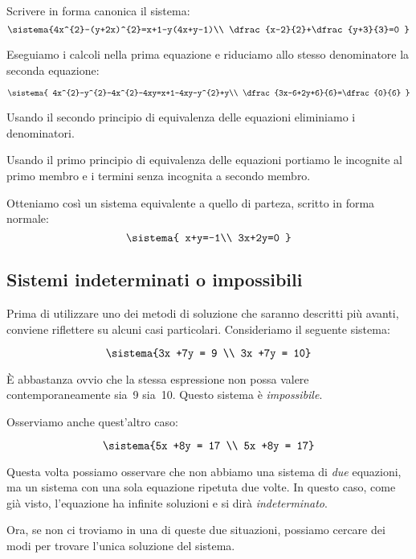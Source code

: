  \begin{esempio}
 Scrivere in forma canonica il sistema:
\[\sistema{4x^{2}-(y+2x)^{2}=x+1-y(4x+y-1)\\
\dfrac{x-2}{2}+\dfrac{y+3}{3}=0
}\]

Eseguiamo i calcoli nella prima equazione e riduciamo allo stesso
denominatore la seconda equazione:

\[\sistema{
 4x^{2}-y^{2}-4x^{2}-4xy=x+1-4xy-y^{2}+y\\
 \dfrac{3x-6+2y+6}{6}=\dfrac{0}{6}
 }\]

Usando il secondo principio di equivalenza delle equazioni eliminiamo i 
denominatori.

Usando il primo principio di equivalenza delle equazioni portiamo le
incognite al primo membro e i termini senza incognita a secondo membro.

Otteniamo così un sistema equivalente a quello di parteza, scritto in forma 
normale:
 \[\sistema{
   x+y=-1\\
   3x+2y=0
}\]
 \end{esempio}

\subsection{Sistemi indeterminati o impossibili}

Prima di utilizzare uno dei metodi di soluzione che saranno descritti più 
avanti, conviene riflettere su alcuni casi particolari. Consideriamo il 
seguente sistema:

\[\sistema{3x +7y = 9 \\ 3x +7y = 10}\]

È abbastanza ovvio che la stessa espressione non possa valere 
contemporaneamente sia~9 sia~10. Questo sistema è \emph{impossibile}.

Osserviamo anche quest'altro caso:

\[\sistema{5x +8y = 17 \\ 5x +8y = 17}\]

Questa volta possiamo osservare che non abbiamo una sistema di \emph{due} 
equazioni, ma un sistema con una sola equazione ripetuta due volte. In questo 
caso, come già visto, l'equazione ha infinite soluzioni e si dirà 
\emph{indeterminato}.

Ora, se non ci troviamo in una di queste due situazioni, possiamo cercare dei 
modi per trovare l'unica soluzione del sistema.


